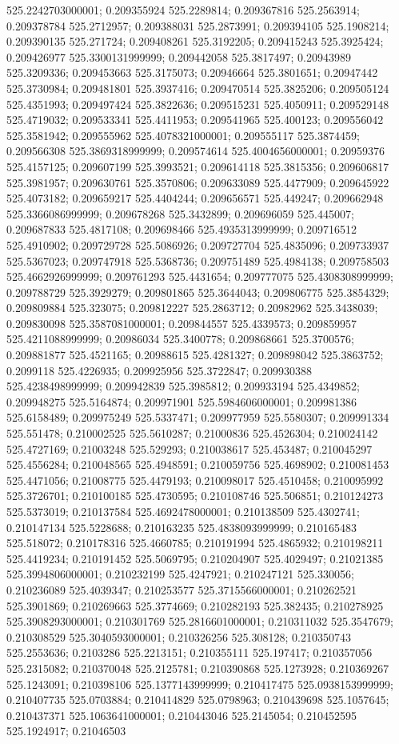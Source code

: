 525.2242703000001; 0.209355924 525.2289814; 0.209367816 525.2563914; 0.209378784 525.2712957; 0.209388031 525.2873991; 0.209394105 525.1908214; 0.209390135 525.271724; 0.209408261 525.3192205; 0.209415243 525.3925424; 0.209426977 525.3300131999999; 0.209442058 525.3817497; 0.20943989 525.3209336; 0.209453663 525.3175073; 0.20946664 525.3801651; 0.20947442 525.3730984; 0.209481801 525.3937416; 0.209470514 525.3825206; 0.209505124 525.4351993; 0.209497424 525.3822636; 0.209515231 525.4050911; 0.209529148 525.4719032; 0.209533341 525.4411953; 0.209541965 525.400123; 0.209556042 525.3581942; 0.209555962 525.4078321000001; 0.209555117 525.3874459; 0.209566308 525.3869318999999; 0.209574614 525.4004656000001; 0.20959376 525.4157125; 0.209607199 525.3993521; 0.209614118 525.3815356; 0.209606817 525.3981957; 0.209630761 525.3570806; 0.209633089 525.4477909; 0.209645922 525.4073182; 0.209659217 525.4404244; 0.209656571 525.449247; 0.209662948 525.3366086999999; 0.209678268 525.3432899; 0.209696059 525.445007; 0.209687833 525.4817108; 0.209698466 525.4935313999999; 0.209716512 525.4910902; 0.209729728 525.5086926; 0.209727704 525.4835096; 0.209733937 525.5367023; 0.209747918 525.5368736; 0.209751489 525.4984138; 0.209758503 525.4662926999999; 0.209761293 525.4431654; 0.209777075 525.4308308999999; 0.209788729 525.3929279; 0.209801865 525.3644043; 0.209806775 525.3854329; 0.209809884 525.323075; 0.209812227 525.2863712; 0.20982962 525.3438039; 0.209830098 525.3587081000001; 0.209844557 525.4339573; 0.209859957 525.4211088999999; 0.20986034 525.3400778; 0.209868661 525.3700576; 0.209881877 525.4521165; 0.20988615 525.4281327; 0.209898042 525.3863752; 0.2099118 525.4226935; 0.209925956 525.3722847; 0.209930388 525.4238498999999; 0.209942839 525.3985812; 0.209933194 525.4349852; 0.209948275 525.5164874; 0.209971901 525.5984606000001; 0.209981386 525.6158489; 0.209975249 525.5337471; 0.209977959 525.5580307; 0.209991334 525.551478; 0.210002525 525.5610287; 0.21000836 525.4526304; 0.210024142 525.4727169; 0.21003248 525.529293; 0.210038617 525.453487; 0.210045297 525.4556284; 0.210048565 525.4948591; 0.210059756 525.4698902; 0.210081453 525.4471056; 0.21008775 525.4479193; 0.210098017 525.4510458; 0.210095992 525.3726701; 0.210100185 525.4730595; 0.210108746 525.506851; 0.210124273 525.5373019; 0.210137584 525.4692478000001; 0.210138509 525.4302741; 0.210147134 525.5228688; 0.210163235 525.4838093999999; 0.210165483 525.518072; 0.210178316 525.4660785; 0.210191994 525.4865932; 0.210198211 525.4419234; 0.210191452 525.5069795; 0.210204907 525.4029497; 0.21021385 525.3994806000001; 0.210232199 525.4247921; 0.210247121 525.330056; 0.210236089 525.4039347; 0.210253577 525.3715566000001; 0.210262521 525.3901869; 0.210269663 525.3774669; 0.210282193 525.382435; 0.210278925 525.3908293000001; 0.210301769 525.2816601000001; 0.210311032 525.3547679; 0.210308529 525.3040593000001; 0.210326256 525.308128; 0.210350743 525.2553636; 0.2103286 525.2213151; 0.210355111 525.197417; 0.210357056 525.2315082; 0.210370048 525.2125781; 0.210390868 525.1273928; 0.210369267 525.1243091; 0.210398106 525.1377143999999; 0.210417475 525.0938153999999; 0.210407735 525.0703884; 0.210414829 525.0798963; 0.210439698 525.1057645; 0.210437371 525.1063641000001; 0.210443046 525.2145054; 0.210452595 525.1924917; 0.21046503 